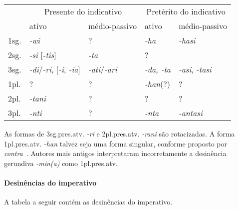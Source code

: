 \begin{center}
	\begin{tabular}[c]{lll|ll}
		\toprule
		     & \multicolumn{2}{c|}{Presente do indicativo}           & \multicolumn{2}{c}{Pretérito do indicativo}                                                \\
		     & ativo                                                 & médio-passivo                               & ativo            & médio-passivo             \\
		\midrule
		1sg. & \emph{-wi}                                            & {?}                                         & \emph{-ha}       & \emph{-hasi}              \\
		2sg. & \emph{-si} [\emph{-tis}]                              & \emph{-ta}                                  & {?}              &                           \\
		3sg. & \emph{-di}\slash{}\emph{-ri}, [\emph{-i}, \emph{-ia}] & \emph{-ati}\slash{}\emph{-ari}              & \emph{-da, -ta}  & \emph{-asi}, \emph{-tasi} \\
		1pl. & {?}                                                   & {?}                                         & \emph{-han}{(?)} & {?}                       \\
		2pl. & \emph{-tani}                                          & {?}                                         & {?}              & {?}                       \\
		3pl. & \emph{-nti}                                           & {?}                                         & \emph{-nta}      & \emph{-antasi}            \\
		\bottomrule
	\end{tabular}
\end{center}

\noindent As formas de 3sg.pres.atv. \emph{-ri} e 2pl.pres.atv. \emph{-rani} são
rotacizadas. A forma 1pl.pres.atv. \emph{-han} talvez seja uma forma singular,
conforme proposto por~\citet{Carruba1984} \emph{contra}~\citet{MorpurgoDavies1980}.
Autores mais antigos interpretaram incorretamente a desinência
gerundiva \emph{-min{(a)}} como 1pl.pres.atv.

\paragraph{Desinências do imperativo}
A tabela a seguir contém as desinências do imperativo.

